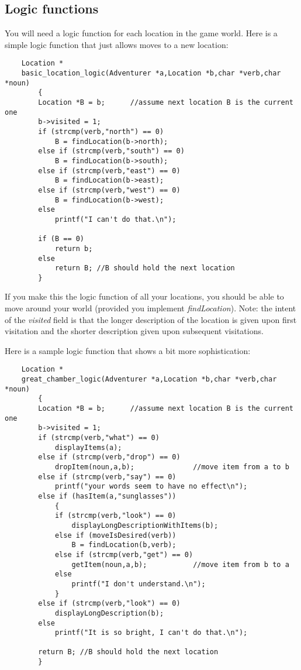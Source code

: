 \documentclass[12pt]{article}
\begin{document}
\subsection*{Logic functions}

You will need a logic function for each location in the game world.
Here is a simple logic function that just allows moves to a new
location:

\begin{verbatim}
    Location *
    basic_location_logic(Adventurer *a,Location *b,char *verb,char *noun)
        {
        Location *B = b;      //assume next location B is the current one
        b->visited = 1;
        if (strcmp(verb,"north") == 0)
            B = findLocation(b->north);
        else if (strcmp(verb,"south") == 0)
            B = findLocation(b->south);
        else if (strcmp(verb,"east") == 0)
            B = findLocation(b->east);
        else if (strcmp(verb,"west") == 0)
            B = findLocation(b->west);
        else
            printf("I can't do that.\n");

        if (B == 0)
            return b;
        else
            return B; //B should hold the next location
        }
\end{verbatim}

If you make this the logic function of all your locations, you should
be able to move around your world (provided you implement 
{\it findLocation}). Note: the intent of the {\it visited} field
is that the longer description of the location is given upon first visitation
and the shorter description given upon subsequent visitations.

Here is a sample logic function that shows a bit more sophistication:

\begin{verbatim}
    Location *
    great_chamber_logic(Adventurer *a,Location *b,char *verb,char *noun)
        {
        Location *B = b;      //assume next location B is the current one
        b->visited = 1;
        if (strcmp(verb,"what") == 0)
            displayItems(a);
        else if (strcmp(verb,"drop") == 0)
            dropItem(noun,a,b);              //move item from a to b
        else if (strcmp(verb,"say") == 0)
            printf("your words seem to have no effect\n");
        else if (hasItem(a,"sunglasses"))
            {
            if (strcmp(verb,"look") == 0)
                displayLongDescriptionWithItems(b);
            else if (moveIsDesired(verb))
                B = findLocation(b,verb);
            else if (strcmp(verb,"get") == 0)
                getItem(noun,a,b);           //move item from b to a
            else
                printf("I don't understand.\n");
            }
        else if (strcmp(verb,"look") == 0)
            displayLongDescription(b);
        else
            printf("It is so bright, I can't do that.\n");

        return B; //B should hold the next location
        }
\end{verbatim}
\end{document}
